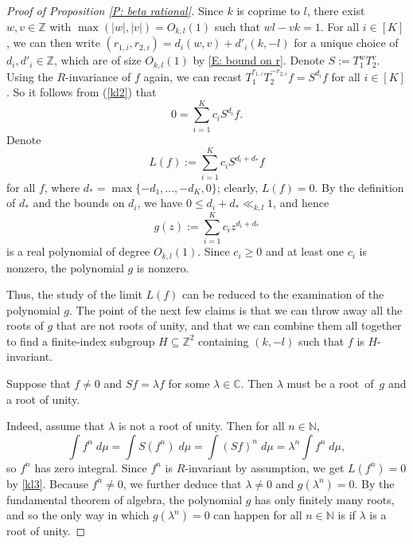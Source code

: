 \documentclass[10pt,a4paper]{amsart}
\newcommand{\N}{{\mathbb N}}
\newcommand{\Z}{{\mathbb Z}}
\begin{document}
\begin{proof}[Proof of Proposition \ref{P: beta rational}]
Since $k$ is coprime to $l$, there exist $w,v\in\mathbb{Z}$ with $\max(\vert w\vert, |v|)=O_{k,l}(1)$ such that $wl-vk=1$. For all $i\in[K]$, we can then write $(r_{1,i}, r_{2,i}) = d_{i}(w,v)+d'_{i}(k,-l)$ for a unique choice of $d_i, d'_i\in\Z$, which are of size $O_{k,l}(1)$ by \eqref{E: bound on r}. Denote $S:=T_1^w T_2^v$. Using the $R$-invariance of $f$ again, we can recast
$T_1^{r_{1,i}}T_2^{-r_{2,i}} f = S^{d_i} f$ for all $i\in[K]$. %
So it follows from (\ref{kl2}) that 
\begin{equation}\label{kl3}
    0=\sum_{i=1}^{K}c_{i}S^{d_{i}}f. %
\end{equation}
Denote 
$$L(f):=\sum_{i=1}^{K}c_{i}S^{d_{i}+d_{\ast}}f$$
for all $f$, where $d_{\ast}=\max\{-d_{1},\dots,-d_{K},0\}$; clearly, $L(f) = 0$. 
By the definition of $d_*$ and the bounds on $d_i$, we have $0\leq d_{i}+d_{\ast} \ll_{k,l}1$, and hence
$$g(z):=\sum_{i=1}^{K}c_{i}z^{d_{i}+d_{\ast}}$$ is a real polynomial of degree $O_{k,l}(1)$. Since $c_{i}\geq 0$ and at least one $c_{i}$ is nonzero, the polynomial $g$ is nonzero. 

Thus, the study of the limit $L(f)$ can be reduced to the examination of the polynomial $g$. The point of the next few claims is that we can throw away all the roots of $g$ that are not roots of unity, and that we can combine them all together to find a finite-index subgroup $H\subseteq\Z^2$ containing $(k,-l)$ such that $f$ is $H$-invariant.
    
\begin{claim}\label{Claim 1}
Suppose that $f\neq 0$ and $Sf=\lambda f$ for some $\lambda\in\mathbb{C}$.
Then $\lambda$ must be a root~of~$g$ and a root of unity. 
\end{claim}

Indeed, assume that $\lambda$ is not a root of unity. Then for all $n\in \N$, $$\int f^n\; d\mu = \int S(f^n)\; d\mu= \int (Sf)^n\; d\mu=\lambda^n\int f^n\; d\mu,$$ so $f^n$ has zero integral.  
Since $f^n$ is $R$-invariant by assumption, we get $L(f^n)=0$ by \eqref{kl3}. Because $f^n\neq 0$, we further deduce that $\lambda\neq 0$ and $g(\lambda^n)=0$. By the fundamental theorem of algebra, the polynomial $g$ has only finitely many roots, and so the only way in which $g(\lambda^n)=0$ can happen for all $n\in\N$ is if $\lambda$ is a root of unity.


\end{proof}
\end{document}
